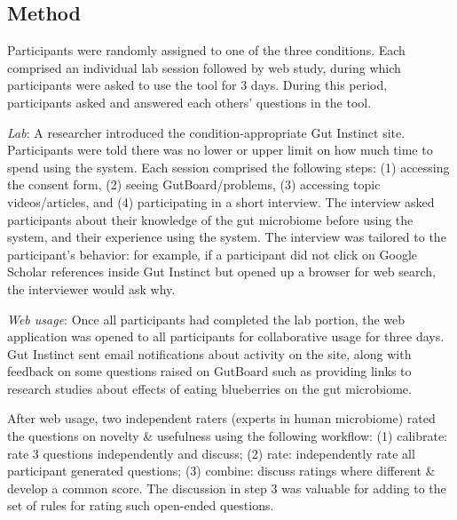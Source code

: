 \subsection*{Method}
Participants were randomly assigned to one of the three conditions. Each comprised an individual lab session followed by web study, during which participants were asked to use the tool for 3 days. During this period, participants asked and answered each others’ questions in the tool.

\textit{Lab}: A researcher introduced the condition-appropriate Gut Instinct site. Participants were told there was no lower or upper limit on how much time to spend using the system. Each session comprised the following steps: (1) accessing the consent form, (2) seeing GutBoard/problems, (3) accessing topic videos/articles, and (4) participating in a short interview. The interview asked participants about their knowledge of the gut microbiome before using the system, and their experience using the system. The interview was tailored to the participant’s behavior: for example, if a participant did not click on Google Scholar references inside Gut Instinct but opened up a browser for web search, the interviewer would ask why.
 
\textit{Web usage}: Once all participants had completed the lab portion, the web application was opened to all participants for collaborative usage for three days. Gut Instinct sent email notifications about activity on the site, along with feedback on some questions raised on GutBoard such as providing links to research studies about effects of eating blueberries on the gut microbiome. 

After web usage, two independent raters (experts in human microbiome) rated the questions on novelty \& usefulness using the following workflow: (1) calibrate: rate 3 questions independently and discuss; (2) rate: independently rate all participant generated questions; (3) combine: discuss ratings where different \& develop a common score. The discussion in step 3 was valuable for adding to the set of rules for rating such open-ended questions. 

